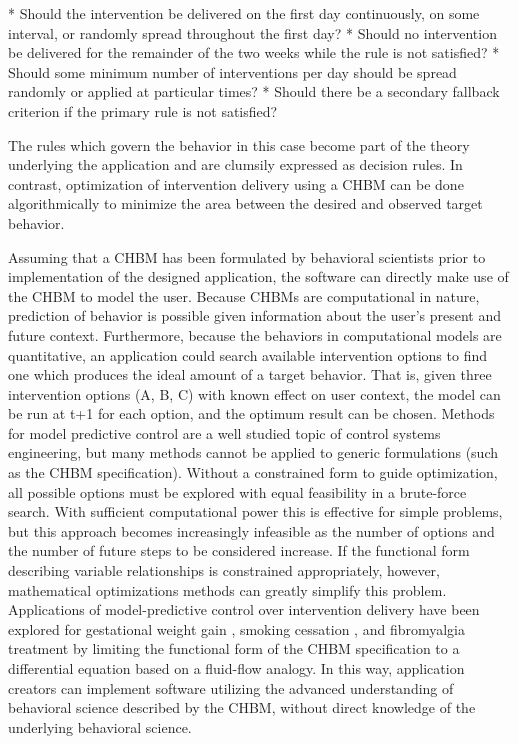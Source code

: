\documentclass[runningheads,a4paper]{llncs}
\begin{document}
* Should the intervention be delivered on the first day continuously, on some interval, or randomly spread throughout the first day?
* Should no intervention be delivered for the remainder of the two weeks while the rule is not satisfied?
* Should some minimum number of interventions per day should be spread randomly or applied at particular times?
* Should there be a secondary fallback criterion if the primary rule is not satisfied?

The rules which govern the behavior in this case become part of the theory underlying the application and are clumsily expressed as decision rules.
In contrast, optimization of intervention delivery using a CHBM can be done algorithmically to minimize the area between the desired and observed target behavior.

Assuming that a CHBM has been formulated by behavioral scientists prior to implementation of the designed application, the software can directly make use of the CHBM to model the user.
Because CHBMs are computational in nature, prediction of behavior is possible given information about the user’s present and future context.
Furthermore, because the behaviors in computational models are quantitative, an application could search available intervention options to find one which produces the ideal amount of a target behavior.
That is, given three intervention options (A, B, C) with known effect on user context, the model can be run at t+1 for each option, and the optimum result can be chosen.
Methods for model predictive control are a well studied topic of control systems engineering, but many methods cannot be applied to generic formulations (such as the CHBM specification).
Without a constrained form to guide optimization, all possible options must be explored with equal feasibility in a brute-force search.
With sufficient computational power this is effective for simple problems, but this approach becomes increasingly infeasible as the number of options and the number of future steps to be considered increase.
If the functional form describing variable relationships is constrained appropriately, however, mathematical optimizations methods can greatly simplify this problem.
Applications of model-predictive control over intervention delivery have been explored for gestational weight gain \cite{dong2013hybrid, dong2014hybrid}, smoking cessation \cite{Timms2014hybrid}, and fibromyalgia treatment \cite{Deshpande2014optimized} by limiting the functional form of the CHBM specification to a differential equation based on a fluid-flow analogy.
In this way, application creators can implement software utilizing the advanced understanding of behavioral science described by the CHBM, without direct knowledge of the underlying behavioral science.
\end{document}
